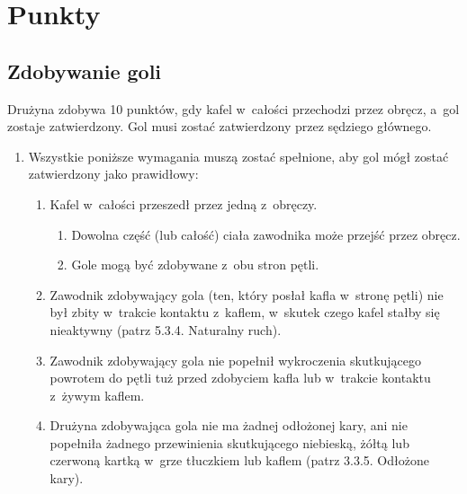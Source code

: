 \documentclass[12pt,a4paper]{article}
\renewcommand{\subsubsection}[1]{
  \oldsubsubsection{#1}%
  \leftskip1.5cm
}
\begin{document}
\pagebreak
\section{Punkty}

\subsection{Zdobywanie goli}

\subsubsection{Prawidłowy gol}
Drużyna zdobywa 10 punktów, gdy kafel w~całości przechodzi przez obręcz, a~gol zostaje zatwierdzony. Gol musi
zostać zatwierdzony przez sędziego głównego.

\begin{enumerate}
	\item
	      Wszystkie poniższe wymagania muszą zostać spełnione, aby gol mógł
	      zostać zatwierdzony jako prawidłowy:

	      \begin{enumerate}
		      \item
		            Kafel w~całości przeszedł przez jedną z~obręczy.

		            \begin{enumerate}
			            \item
			                  Dowolna część (lub całość) ciała zawodnika może przejść przez
			                  obręcz.
			            \item
			                  Gole mogą być zdobywane z~obu stron pętli.
		            \end{enumerate}
		      \item
		            Zawodnik zdobywający gola (ten, który posłał kafla w~stronę pętli)
		            nie był zbity w~trakcie kontaktu z~kaflem, w~skutek czego kafel
		            stałby się nieaktywny (patrz 5.3.4. Naturalny ruch).
		      \item
		            Zawodnik zdobywający gola nie popełnił wykroczenia skutkującego
		            powrotem do pętli tuż przed zdobyciem kafla lub w~trakcie kontaktu
		            z~żywym kaflem.
		      \item
		            Drużyna zdobywająca gola nie ma żadnej odłożonej kary, ani nie
		            popełniła żadnego przewinienia skutkującego niebieską, żółtą lub
		            czerwoną kartką w~grze tłuczkiem lub kaflem (patrz 3.3.5. Odłożone
		            kary).


\end{enumerate}
\end{enumerate}
\end{document}

